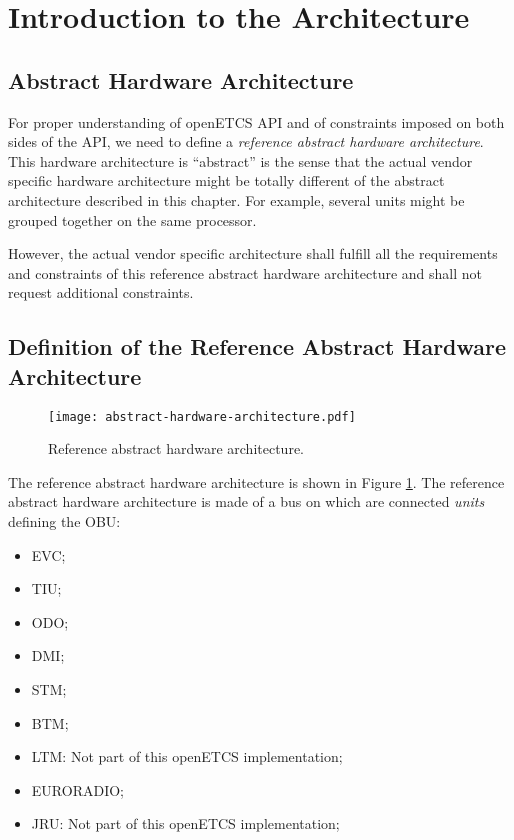 
\section{Introduction to the Architecture}

\subsection{Abstract Hardware Architecture}

For proper understanding of openETCS API and of constraints imposed on
both sides of the API, we need to define a \emph{reference abstract hardware architecture}. This hardware architecture is ``abstract''
is the sense that the actual vendor specific hardware architecture
might be totally different of the abstract architecture described in
this chapter. For example, several units might be grouped together on
the same processor.

However, the actual vendor specific architecture shall fulfill all the
requirements and constraints of this reference abstract hardware
architecture and shall not request additional constraints.

\subsection{Definition of the Reference Abstract Hardware Architecture}

\begin{figure}
  \centering
  \texttt{[image: abstract-hardware-architecture.pdf]}
  \caption{Reference abstract hardware architecture.}
  \label{fig:hardware-arch}
\end{figure}

The reference abstract hardware architecture is shown in Figure
\ref{fig:hardware-arch}. The reference abstract hardware architecture is made of a bus on which are connected \emph{units} defining the OBU:

\begin{itemize}
\item {EVC};
\item {TIU};
\item {ODO};
\item {DMI};
\item {STM};
\item {BTM};
\item {LTM}: Not part of this openETCS implementation;
\item EURORADIO;
\item {JRU}: Not part of this openETCS implementation;
\end{itemize}


